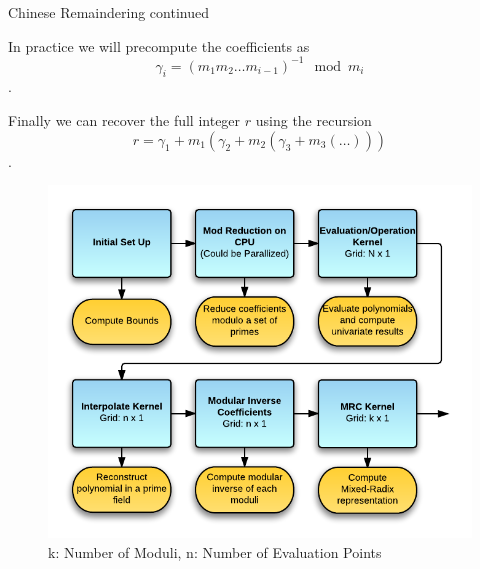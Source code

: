 \documentclass{beamer}
\begin{document}
		\begin{frame}{Chinese Remaindering continued}
			
			In practice we will precompute the coefficients as $$\gamma_i = (m_1m_2\dots m_{i-1})^{-1} \mod{m_i}$$.
			
			Finally we can recover the full integer $r$ using the recursion
			$$ r = \gamma_1 + m_1(\gamma_2 + m_2(\gamma_3 + m_3(\dots)))$$.
		\end{frame}	
		\begin{frame}
			\vspace{0.0in}
			\begin{figure}
				\centering
				\includegraphics[scale=0.40]{../Code/Images/FlowCUDAPoly3.png}
				\caption{k: Number of Moduli, n: Number of Evaluation Points}	
			\end{figure}
		\end{frame}	
		
\end{document}
